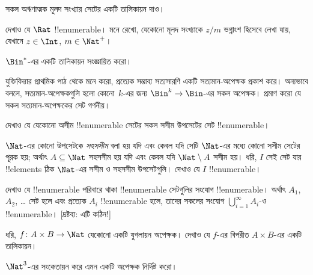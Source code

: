 \documentclass[../../../include/open-logic-section]{subfiles}
\begin{document}
\begin{prob}
সকল অঋণাত্মক মূলদ সংখ্যার সেটের একটি তালিকায়ন দাও।
\end{prob}

\begin{prob}
দেখাও যে $\Rat$ !!{enumerable}। মনে রেখো, যেকোনো মূলদ সংখ্যাকে $z/m$ ভগ্নাংশ হিসেবে লেখা যায়, যেখানে $z \in \Int$, $m \in \Nat^+$।
\end{prob}

\begin{prob}
$\Bin^*$-এর একটি তালিকায়ন সংজ্ঞায়িত করো।
\end{prob}

\begin{prob}
যুক্তিবিদ্যার প্রাথমিক পাঠ থেকে মনে করো, প্রত্যেক সম্ভাব্য সত্যসারণি একটি সত্যমান-অপেক্ষক প্রকাশ করে। অন্যভাবে বললে, সত্যমান-অপেক্ষকগুলি হলো কোনো~$k$-এর জন্য $\Bin^k \to \Bin$-এর সকল অপেক্ষক। প্রমাণ করো যে সকল সত্যমান-অপেক্ষকের সেট গণনীয়।
\end{prob}

\begin{prob}
দেখাও যে যেকোনো অসীম !!{enumerable} সেটের সকল সসীম উপসেটের সেট !!{enumerable}।
\end{prob}

\begin{prob}
$\Nat$-এর কোনো উপসেটকে \emph{সহসসীম} বলা হয় যদি এবং কেবল যদি সেটি $\Nat$-এর মধ্যে কোনো সসীম সেটের পূরক হয়; অর্থাৎ $A \subseteq \Nat$ সহসসীম হয় যদি এবং কেবল যদি $\Nat\setminus A$ সসীম হয়। ধরি, $I$ সেই সেট যার !!{element}s ঠিক $\Nat$-এর সসীম ও সহসসীম উপসেটগুলি। দেখাও যে $I$ !!{enumerable}। 
\end{prob}

\begin{prob}
দেখাও যে !!{enumerable} পরিবারে থাকা !!{enumerable} সেটগুলির সংযোগ !!{enumerable}। অর্থাৎ $A_1$, $A_2$, \dots{} সেট হলে এবং প্রত্যেক $A_i$ !!{enumerable} হলে, তাদের সকলের সংযোগ $\bigcup_{i=1}^\infty
A_i$-ও !!{enumerable}। [দ্রষ্টব্য: এটি কঠিন!]
\end{prob}

\begin{prob}
ধরি, $f \colon A \times B \to \Nat$ যেকোনো একটি যুগলায়ন অপেক্ষক। দেখাও যে $f$-এর বিপরীত $A \times B$-এর একটি তালিকায়ন।
\end{prob}

\begin{prob}
$\Nat^3$-এর সংকেতায়ন করে এমন একটি অপেক্ষক নির্দিষ্ট করো।
\end{prob}
\end{document}
